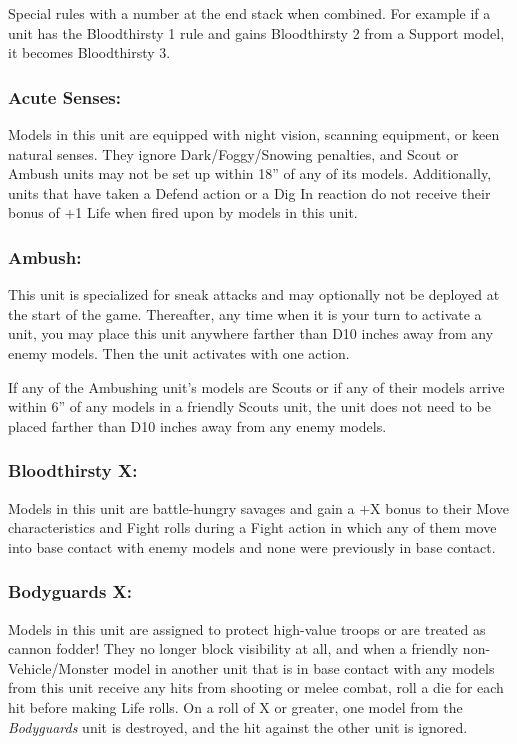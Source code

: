 \begin{multicols}{2}
Special rules with a number at the end stack when combined. For example if a unit has the Bloodthirsty 1 rule and gains Bloodthirsty 2 from a Support model, it becomes Bloodthirsty 3.

\subsubsection*{Acute Senses:} Models in this unit are equipped with night vision, scanning equipment, or keen natural senses. They ignore Dark/Foggy/Snowing penalties, and Scout or Ambush units may not be set up within 18'' of any of its models. Additionally, units that have taken a Defend action or a Dig In reaction do not receive their bonus of +1 Life when fired upon by models in this unit.

\subsubsection*{Ambush:} This unit is specialized for sneak attacks and may optionally not be deployed at the start of the game. Thereafter, any time when it is your turn to activate a unit, you may place this unit anywhere farther than D10 inches away from any enemy models. Then the unit activates with one action.

If any of the Ambushing unit's models are Scouts or if any of their models arrive within 6'' of any models in a friendly Scouts unit, the unit does not need to be placed farther than D10 inches away from any enemy models.

\subsubsection*{Bloodthirsty X:} Models in this unit are battle-hungry savages and gain a +X bonus to their Move characteristics and Fight rolls during a Fight action in which any of them move into base contact with enemy models and none were previously in base contact.

\subsubsection*{Bodyguards X:} Models in this unit are assigned to protect high-value troops or are treated as cannon fodder! They no longer block visibility at all, and when a friendly non-Vehicle/Monster model in another unit that is in base contact with any models from this unit receive any hits from shooting or melee combat, roll a die for each hit before making Life rolls. On a roll of X or greater, one model from the \textit{Bodyguards} unit is destroyed, and the hit against the other unit is ignored.


\end{multicols}
